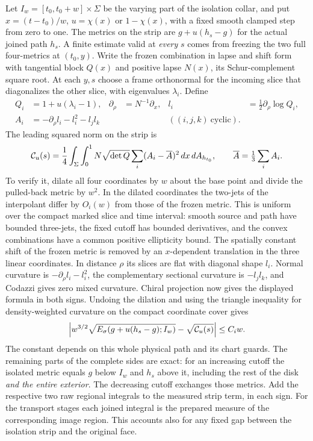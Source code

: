 \documentclass[11pt,letterpaper]{article}
\numberwithin{equation}{section}
\begin{document}
Let \(I_w=[t_0,t_0+w]\times\Sigma\) be the varying part of the
isolation collar, and put \(x=(t-t_0)/w\), \(u=\chi(x)\) or
\(1-\chi(x)\), with a fixed smooth clamped step from zero to one.
The metrics on the strip are \(g+u(h_s-g)\) for the actual joined
path \(h_s\). A finite estimate valid at \emph{every} \(s\) comes
from freezing the two full four-metrics at \((t_0,y)\).
Write the frozen combination in lapse and shift form with
tangential block \(Q(x)\) and positive lapse \(N(x)\), its
Schur-complement square root. At each \(y,s\) choose a frame
orthonormal for the incoming slice that diagonalizes the other
slice, with eigenvalues \(\lambda_i\). Define
\[
\begin{aligned}
 Q_i&=1+u(\lambda_i-1),&
 \partial_\rho&=N^{-1}\partial_x,&
 l_i&=\tfrac12\partial_\rho\log Q_i,\\
 A_i&=-\partial_\rho l_i-l_i^2-l_jl_k
     &&& ((i,j,k)\ \text{cyclic}).
\end{aligned}
\]
The leading squared norm on the strip is
\[
 {\cal C}_u(s)=\frac14\int_\Sigma\int_0^1
 N\sqrt{\det Q}\sum_i(A_i-\overline A)^2\,dx\,dA_{h_{t_0}},
 \qquad \overline A=\tfrac13\sum_i A_i .
\]
To verify it, dilate all four coordinates by \(w\) about the base
point and divide the pulled-back metric by \(w^2\). In the dilated
coordinates the two-jets of the interpolant differ by \(O_i(w)\)
from those of the frozen metric. This is uniform over the compact
marked slice and time interval: smooth source and path have bounded
three-jets, the fixed cutoff has bounded derivatives, and the convex
combinations have a common positive ellipticity bound.
The spatially constant shift of the frozen metric is removed
by an \(x\)-dependent translation in the three linear coordinates.
In distance \(\rho\) its slices are flat with diagonal shape \(l_i\).
Normal curvature is \(-\partial_\rho l_i-l_i^2\), the complementary
sectional curvature is \(-l_jl_k\), and Codazzi gives zero mixed
curvature. Chiral projection now gives the displayed formula in
both signs. Undoing the dilation and using the triangle inequality
for density-weighted curvature on the compact coordinate cover gives
\[
 \left|w^{3/2}\sqrt{E_\sigma(g+u(h_s-g);I_w)}
                   -\sqrt{{\cal C}_u(s)}\right|\le C_i w .
\]
The constant depends on this whole physical path and its chart
guards. The remaining parts of the complete sides are exact:
for an increasing cutoff the isolated metric equals \(g\)
below \(I_w\) and \(h_s\) above it, including the rest of the
disk \emph{and the entire exterior}. The decreasing cutoff exchanges
those metrics. Add the respective two raw regional integrals to
the measured strip term, in each sign. For the transport stages
each joined integral is the prepared measure of the corresponding
image region. This accounts also for any fixed gap between the
isolation strip and the original face.
\end{document}
